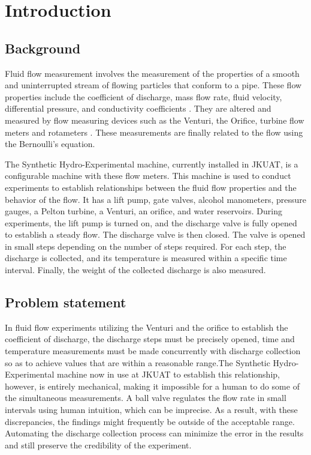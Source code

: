\section{Introduction}
\label{sec:introduction}
\subsection{Background}
Fluid flow measurement involves the measurement of the properties of a smooth and uninterrupted stream of flowing particles that conform to a pipe. These flow properties include the coefficient of discharge, mass flow rate, fluid velocity, differential pressure, and conductivity coefficients \cite{pereira2009flow}. They are altered and measured by flow measuring devices such as the Venturi, the Orifice, turbine flow meters and rotameters \cite{nandagopal2022fluid}. These measurements are finally related to the flow using the Bernoulli's equation. 

\par
The Synthetic Hydro-Experimental machine, currently installed in JKUAT, is a configurable machine with these flow meters. This machine is used to conduct experiments to establish relationships between the fluid flow properties and the behavior of the flow. It has a lift pump, gate valves, alcohol manometers, pressure gauges, a Pelton turbine, a Venturi, an orifice, and water reservoirs.  During experiments, the lift pump is turned on, and the discharge valve is fully opened to establish a steady flow.  The discharge valve is then closed. The valve is opened in small steps depending on the number of steps required. For each step, the discharge is collected, and its temperature is measured within a specific time interval. Finally, the weight of the collected discharge is also measured.

\subsection{Problem statement}

In fluid flow experiments utilizing the Venturi and the orifice to establish the coefficient of discharge, the discharge steps must be precisely opened, time and temperature measurements must be made concurrently with discharge collection so as to achieve values that are within a reasonable range.The Synthetic Hydro-Experimental machine now in use at JKUAT to establish this relationship, however, is entirely mechanical, making it impossible for a human to do some of the simultaneous measurements. A ball valve regulates the flow rate in small intervals using human intuition, which can be imprecise. As a result, with these discrepancies, the findings might frequently be outside of the acceptable range. Automating the discharge collection process can minimize the error in the results and still preserve the credibility of the experiment.

